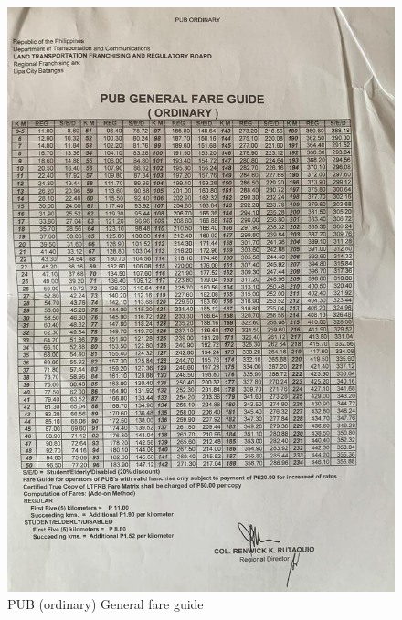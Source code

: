 \documentclass[journal]{./IEEE/IEEEtran}
\begin{document}
\section{}
\begin{figure}[!h]
    \centering
        \includegraphics[scale=0.14]{./figures/ltfrb/pub ordinary.jpeg}
    \caption{PUB (ordinary) General fare guide}
\end{figure}



\end{document}
